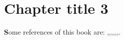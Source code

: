 \chapter{Chapter title 3}
\noindent \lettrine[lines=2,loversize=0.15,nindent=0pt]{\bf\textcolor{myGris}{S}}{}ome references of this book are: \cite{Cou-40},\cite{Cou-78},\cite{Gut-78},\cite{Li-12},\cite{Gut-06},\cite{Gut-17},\cite{Gut-16}. \lipsum[1-4]
\lipsum[1-4]

